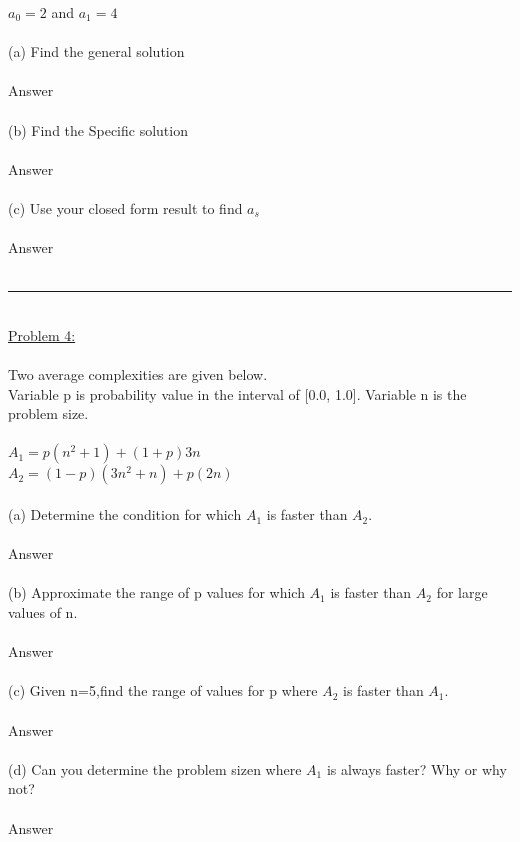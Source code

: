 \documentclass{article}
\begin{document}
    \indent $a_0 = 2$ and $a_1 = 4$\\
    \\
    (a) Find the general solution\\
    \\
    \indent Answer\\
    \\
    (b) Find the Specific solution\\
    \\
    \indent Answer\\
    \\
    (c) Use your closed form result to find $a_s$\\
    \\
    \indent Answer\\
    \\
    \rule{\textwidth}{0.5pt}\\
    \underline{Problem 4:}\\\\
    Two average complexities are given below.\\Variable p is probability value in the interval of [0.0, 1.0]. Variable n is the problem size. \\
    \\
    $A_1 = p(n^2 + 1) + (1 + p)3n$\\
    $A_2 = (1 - p) (3n^2 + n) + p(2n)$\\
    \\
    (a) Determine the condition for which $A_1$ is faster than $A_2$.\\
    \\
    \indent Answer\\
    \\
    (b) Approximate the range of p values for which $A_1$ is faster than $A_2$ for large values of n.\\
    \\
    \indent Answer\\
    \\
    (c) Given n=5,find the range of values for p where $A_2$ is faster than $A_1$.\\
    \\
    \indent Answer\\
    \\
    (d) Can you determine the problem sizen where $A_1$ is always faster? Why or why not?\\
    \\
    \indent Answer\\
    \\
\end{document}
